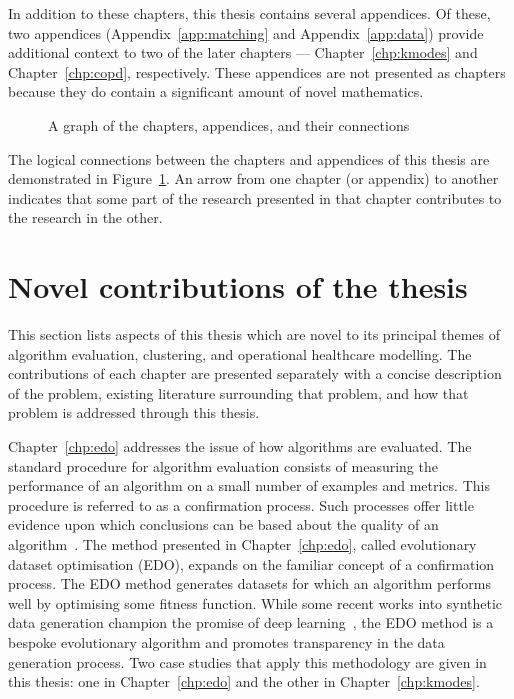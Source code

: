 In addition to these chapters, this thesis contains several appendices. Of
these, two appendices (Appendix~\ref{app:matching} and Appendix~\ref{app:data})
provide additional context to two of the later chapters ---
Chapter~\ref{chp:kmodes} and Chapter~\ref{chp:copd}, respectively. These
appendices are not presented as chapters because they do contain a significant
amount of novel mathematics.

\begin{figure}[htbp]
    \centering%
    \resizebox{\imgwidth}{!}{%
        
    }
    \caption{%
        A graph of the chapters, appendices, and their connections%
    }\label{fig:structure}
\end{figure}

The logical connections between the chapters and appendices of this thesis are
demonstrated in Figure~\ref{fig:structure}. An arrow from one chapter (or
appendix) to another indicates that some part of the research presented in that
chapter contributes to the research in the other. 


\section{Novel contributions of the thesis}\label{sec:novel}

This section lists aspects of this thesis which are novel to its principal
themes of algorithm evaluation, clustering, and operational healthcare
modelling. The contributions of each chapter are presented separately with a
concise description of the problem, existing literature surrounding that
problem, and how that problem is addressed through this thesis.

Chapter~\ref{chp:edo} addresses the issue of how algorithms are evaluated. The
standard procedure for algorithm evaluation consists of measuring the
performance of an algorithm on a small number of examples and metrics. This
procedure is referred to as a confirmation process. Such processes offer little
evidence upon which conclusions can be based about the quality of an
algorithm~\cite{Parker2020}. The method presented in Chapter~\ref{chp:edo},
called evolutionary dataset optimisation (EDO), expands on the familiar concept
of a confirmation process. The EDO method generates datasets for which an
algorithm performs well by optimising some fitness function. While some recent
works into synthetic data generation champion the promise of deep
learning~\cite{Avino2018,Park2018,Torfi2020}, the EDO method is a bespoke
evolutionary algorithm and promotes transparency in the data generation process.
Two case studies that apply this methodology are given in this thesis: one in
Chapter~\ref{chp:edo} and the other in Chapter~\ref{chp:kmodes}.

